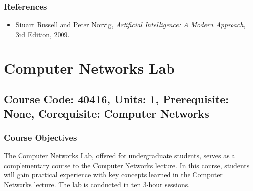 \documentclass[12pt]{article}
\begin{document}
\subsubsection*{References}
\begin{itemize}
    \item Stuart Russell and Peter Norvig, \textit{Artificial Intelligence: A Modern Approach}, 3rd Edition, 2009.
\end{itemize}

\newpage

\section{Computer Networks Lab}
\subsection*{Course Code: 40416, Units: 1, Prerequisite: None, Corequisite: Computer Networks}

\subsubsection*{Course Objectives}
The Computer Networks Lab, offered for undergraduate students, serves as a complementary course to the Computer Networks lecture. In this course, students will gain practical experience with key concepts learned in the Computer Networks lecture. The lab is conducted in ten 3-hour sessions.
\end{document}
